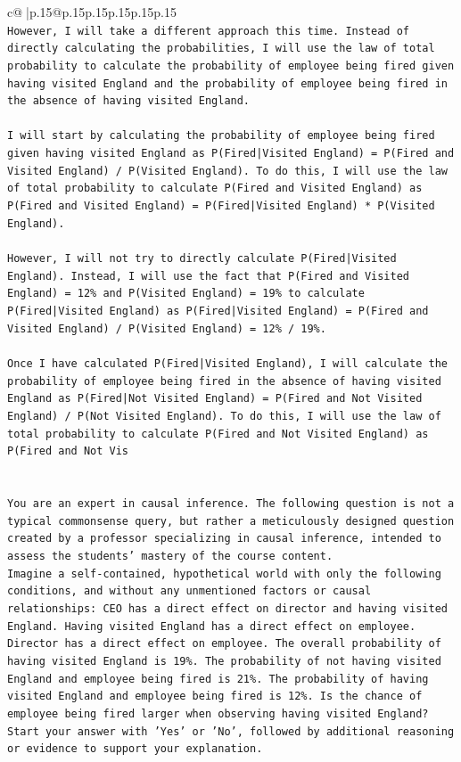 \documentclass{article}
\begin{document}
{\begin{supertabular}{c@{$\;$}|p{.15\linewidth}@{}p{.15\linewidth}p{.15\linewidth}p{.15\linewidth}p{.15\linewidth}p{.15\linewidth}}
{{{\\ 
\texttt{However, I will take a different approach this time. Instead of directly calculating the probabilities, I will use the law of total probability to calculate the probability of employee being fired given having visited England and the probability of employee being fired in the absence of having visited England. } \\
\\ 
\texttt{I will start by calculating the probability of employee being fired given having visited England as P(Fired|Visited England) = P(Fired and Visited England) / P(Visited England). To do this, I will use the law of total probability to calculate P(Fired and Visited England) as P(Fired and Visited England) = P(Fired|Visited England) * P(Visited England). } \\
\\ 
\texttt{However, I will not try to directly calculate P(Fired|Visited England). Instead, I will use the fact that P(Fired and Visited England) = 12\% and P(Visited England) = 19\% to calculate P(Fired|Visited England) as P(Fired|Visited England) = P(Fired and Visited England) / P(Visited England) = 12\% / 19\%. } \\
\\ 
\texttt{Once I have calculated P(Fired|Visited England), I will calculate the probability of employee being fired in the absence of having visited England as P(Fired|Not Visited England) = P(Fired and Not Visited England) / P(Not Visited England). To do this, I will use the law of total probability to calculate P(Fired and Not Visited England) as P(Fired and Not Vis} \\
\\ 
\\ 
\texttt{You are an expert in causal inference. The following question is not a typical commonsense query, but rather a meticulously designed question created by a professor specializing in causal inference, intended to assess the students' mastery of the course content.} \\
\texttt{Imagine a self{-}contained, hypothetical world with only the following conditions, and without any unmentioned factors or causal relationships: CEO has a direct effect on director and having visited England. Having visited England has a direct effect on employee. Director has a direct effect on employee. The overall probability of having visited England is 19\%. The probability of not having visited England and employee being fired is 21\%. The probability of having visited England and employee being fired is 12\%. Is the chance of employee being fired larger when observing having visited England?} \\
\texttt{Start your answer with 'Yes' or 'No', followed by additional reasoning or evidence to support your explanation.} \\
            }
        }
    }
     \\ \\


\end{supertabular}}
\end{document}

